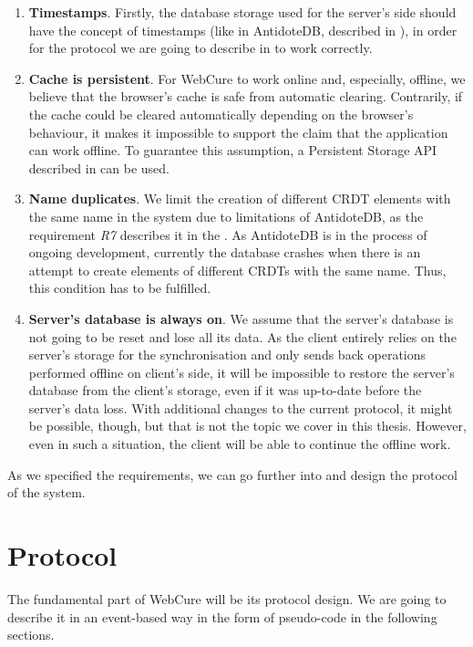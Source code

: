 \begin{enumerate}
\item {\textbf{Timestamps}. Firstly, the database storage used for the server's side should have the concept of timestamps (like in AntidoteDB, described in ), in order for the protocol we are going to describe in  to work correctly.}
\item {\textbf{Cache is persistent}. For WebCure to work online and, especially, offline, we believe that the browser's cache is safe from automatic clearing. Contrarily, if the cache could be cleared automatically depending on the browser's behaviour, it makes it impossible to support the claim that the application can work offline. To guarantee this assumption, a Persistent Storage API described in  can be used.}
\item{\textbf{Name duplicates}. We limit the creation of different CRDT elements with the same name in the system due to limitations of AntidoteDB, as the requirement \textit{R7} describes it in the . As AntidoteDB is in the process of ongoing development, currently the database crashes when there is an attempt to create elements of different CRDTs with the same name. Thus, this condition has to be fulfilled.}
\item{\textbf{Server's database is always on}. We assume that the server's database is not going to be reset and lose all its data. As the client entirely relies on the server's storage for the synchronisation and only sends back operations performed offline on client's side, it will be impossible to restore the server's database from the client's storage, even if it was up-to-date before the server's data loss. With additional changes to the current protocol, it might be possible, though, but that is not the topic we cover in this thesis. However, even in such a situation, the client will be able to continue the offline work.}
\end{enumerate}

As we specified the requirements, we can go further into and design the protocol of the system.

\section{Protocol}
\label{4-protocol}

The fundamental part of WebCure will be its protocol design. We are going to describe it in an event-based way in the form of pseudo-code in the following sections. 

